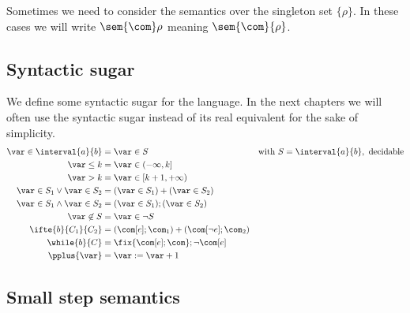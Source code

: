 \begin{notation}
  Sometimes we need to consider the semantics over the singleton set
  \(\{\rho\}\). In these cases we will write \(\sem{\com}\rho\)
  meaning \(\sem{\com}\{\rho\}\).
\end{notation}


\subsection{Syntactic sugar}\label{sub:sugar}
We define some syntactic sugar for the language. In the next chapters
we will often use the syntactic sugar instead of its real equivalent
for the sake of simplicity.
\begin{align*}
  \var \in \interval{a}{b} & = \var \in S & \text{with } S = \interval{a}{b}, \text{ decidable}\\
  \var \leq k & = \var \in (-\infty, k]\\
  \var > k & = \var \in [k+1, + \infty) \\
  \var \in S_1 \vee \var \in S_2 & = (\var \in S_1) + (\var \in S_2) \\ 
  \var \in S_1 \wedge \var \in S_2 & = (\var \in S_1);(\var \in S_2) \\
  \var \not\in S & = \var \in \neg S \\
  \ifte{b}{C_1}{C_2} & = (\com[e];\com_1) + (\com[\neg e];\com_2) \\
  \while{b}{C} & = \fix{\com[e];\com};\neg\com[e] \\
  \pplus{\var} & = \var := \var + 1
\end{align*}

\subsection{Small step semantics}\label{sub:sos}

